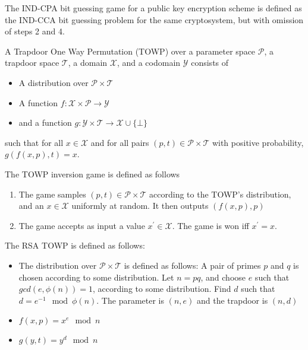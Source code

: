 \documentclass[a4paper,german]{article}
\newenvironment{customdef}[1]{\renewcommand\theinnercustomdef{#1}\innercustomdef}{\endinnercustomdef}
\begin{document}
\begin{customdef}{3.13}
	The IND-CPA bit guessing game for a public key encryption scheme is defined as the IND-CCA bit guessing problem for the same cryptosystem, but with omission of steps 2 and 4.
\end{customdef}

\begin{customdef}{3.14}
	A Trapdoor One Way Permutation (TOWP) over a parameter space $\mathcal{P}$, a trapdoor space $\mathcal{T}$, a domain $\mathcal{X}$, and a codomain $\mathcal{Y}$ consists of

	\begin{itemize}

		\item  A distribution over $\mathcal{P \times T}$
		\item  A function $f: \mathcal{X \times P} \rightarrow \mathcal{Y}$
		\item  and a function $g: \mathcal{Y \times T} \rightarrow \mathcal{X} \cup \{\bot\}$
	\end{itemize}
	such that for all $x \in \mathcal{X}$ and for all pairs $(p, t) \in \mathcal{P \times T}$ with positive probability, $g(f(x, p), t) = x$.
\end{customdef}

\begin{customdef}{3.15}
	The TOWP inversion game is defined as follows

	\begin{enumerate}

		\item  The game samples $(p, t) \in \mathcal{P \times T}$ according to the TOWP's distribution, and an $x \in \mathcal{X}$ uniformly at random. It then outputs $(f(x, p), p)$
		\item  The game accepts as input a value $x^\prime \in \mathcal{X}$. The game is won iff $x^\prime = x$.

	\end{enumerate}
\end{customdef}

\begin{customdef}{3.16}
	The RSA TOWP is defined as follows:

	\begin{itemize}

		\item  The distribution over $\mathcal{P \times T}$ is defined as follows:
			A pair of primes $p$ and $q$ is chosen according to some distribution. Let $n = pq$, and choose $e$ such that $gcd(e, \phi(n))=1$, according to some distribution. Find $d$ such that $d = e^{-1} \mod \phi(n)$. The parameter is  $(n, e)$ and the trapdoor is $(n, d)$
		\item  $f(x, p) = x^e \mod n$
		\item  $g(y, t) = y^d \mod n$

	\end{itemize}
\end{customdef}
\end{document}
